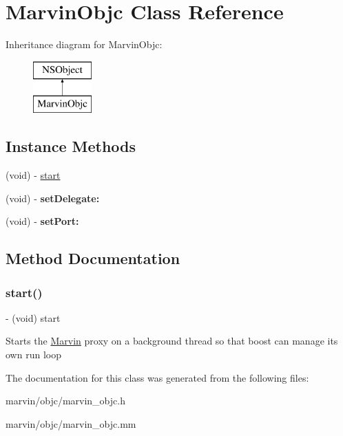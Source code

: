 \hypertarget{interface_marvin_objc}{}\section{Marvin\+Objc Class Reference}
\label{interface_marvin_objc}
Inheritance diagram for Marvin\+Objc\+:\begin{figure}[H]
\begin{center}
\leavevmode
\includegraphics[height=2.000000cm]{interface_marvin_objc}
\end{center}
\end{figure}
\subsection*{Instance Methods}
\begin{DoxyCompactItemize}
\item 
(void) -\/ \hyperlink{interface_marvin_objc_a5f10e6ef563d08e6a7ef1fcb9495b36f}{start}
\item 
\mbox{\label{interface_marvin_objc_aa0525a6aed868a4821768b9131ae5412}} 
(void) -\/ {\bfseries set\+Delegate\+:}
\item 
\mbox{\label{interface_marvin_objc_a49d1fa6327a38fa34e35566499e6058f}} 
(void) -\/ {\bfseries set\+Port\+:}
\end{DoxyCompactItemize}


\subsection{Method Documentation}
\mbox{\label{interface_marvin_objc_a5f10e6ef563d08e6a7ef1fcb9495b36f}} 
\subsubsection{\texorpdfstring{start()}{start()}}
{\footnotesize\ttfamily -\/ (void) start \begin{DoxyParamCaption}{ }\end{DoxyParamCaption}}

Starts the \hyperlink{namespace_marvin}{Marvin} proxy on a background thread so that boost can manage its own run loop 

The documentation for this class was generated from the following files\+:\begin{DoxyCompactItemize}
\item 
marvin/objc/marvin\+\_\+objc.\+h\item 
marvin/objc/marvin\+\_\+objc.\+mm\end{DoxyCompactItemize}
